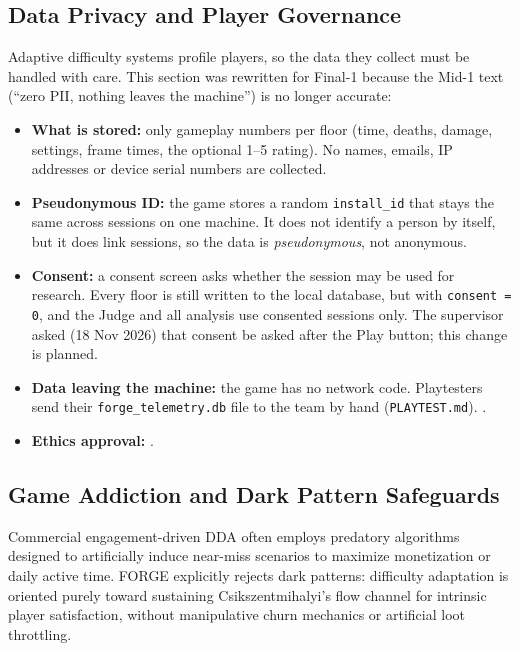 \subsection*{Data Privacy and Player Governance}
Adaptive difficulty systems profile players, so the data they collect must be handled with care. This section was rewritten for Final-1 because the Mid-1 text (``zero PII, nothing leaves the machine'') is no longer accurate:
\begin{itemize}
    \item \textbf{What is stored:} only gameplay numbers per floor (time, deaths, damage, settings, frame times, the optional 1--5 rating). No names, emails, IP addresses or device serial numbers are collected.
    \item \textbf{Pseudonymous ID:} the game stores a random \texttt{install\_id} that stays the same across sessions on one machine. It does not identify a person by itself, but it does link sessions, so the data is \emph{pseudonymous}, not anonymous.
    \item \textbf{Consent:} a consent screen asks whether the session may be used for research. Every floor is still written to the local database, but with \texttt{consent = 0}, and the Judge and all analysis use consented sessions only. The supervisor asked (18 Nov 2026) that consent be asked after the Play button; this change is planned.
    \item \textbf{Data leaving the machine:} the game has no network code. Playtesters send their \texttt{forge\_telemetry.db} file to the team by hand (\texttt{PLAYTEST.md}). .
    \item \textbf{Ethics approval:} .
\end{itemize}

\subsection*{Game Addiction and Dark Pattern Safeguards}
Commercial engagement-driven DDA often employs predatory algorithms designed to artificially induce near-miss scenarios to maximize monetization or daily active time. FORGE explicitly rejects dark patterns: difficulty adaptation is oriented purely toward sustaining Csikszentmihalyi's flow channel for intrinsic player satisfaction, without manipulative churn mechanics or artificial loot throttling.

